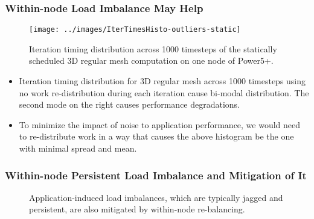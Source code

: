 \begin{frame}[label=workredistributionNoise]
\frametitle{Within-node Load Imbalance May Help}
\begin{figure}[ht!]
\label{fig:stat-histo}
\begin{center}
\texttt{[image: ../images/IterTimesHisto-outliers-static]}\\
\end{center}
\caption{\label{fig:stat-histo} \small Iteration timing distribution across 1000 timesteps of the
statically scheduled 3D regular mesh computation on one node of Power5+. }
\end{figure} 

\begin{itemize} 
\tiny  \item \tiny Iteration timing distribution
  for 3D regular mesh across 1000 timesteps using no work
  re-distribution during each iteration cause
  bi-modal distribution. The second mode on the right causes 
  performance degradations. 
 \item \tiny To minimize the impact of noise to application performance, 
  we would need to re-distribute work in a way that causes the above
  histogram be the one with minimal spread and mean.
\end{itemize} 

\end{frame}

\begin{frame}[label=mitigationWithinNode]
\frametitle{Within-node Persistent Load Imbalance and Mitigation of It}
\begin{figure}[ht]
\label{fig:AppPersistentImbPic}
\label{fig:AmplificationPic3}\hspace*{0.25in}
\caption{\label{fig:AppPersistentImbPic} Application-induced load imbalances, which are typically jagged and persistent, are also mitigated by within-node re-balancing. }
\end{figure}
\end{frame}

